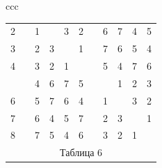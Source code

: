 \begin{center}
\begin{tabular}{ccc}
\begin{tabular}{ccccccccccc}
2 & \vline & 1 & \ & 3 & 2 & \vline & 6 & 7 & 4 & 5 \\


3 & \vline & 2 & 3 & \ & 1 & \vline & 7 & 6 & 5 & 4 \\


4 & \vline & 3 & 2 & 1 & \ & \vline & 5 & 4 & 7 & 6 \\


\hline


 5 & \vline & 4 & 6 & 7 & 5 & \vline & \ & 1 & 2 & 3 \\


6 & \vline & 5 & 7 & 6 & 4 & \vline & 1 & \ & 3 & 2 \\


7 & \vline & 6 & 4 & 5 & 7 & \vline & 2 & 3 & \ & 1 \\


8 & \vline & 7 & 5 & 4 & 6 & \vline & 3 & 2 & 1 & \ \\


\multicolumn{11}{c}{ Таблица 6}


\end{tabular}





\end{tabular}


\end{center}


\smallskip





